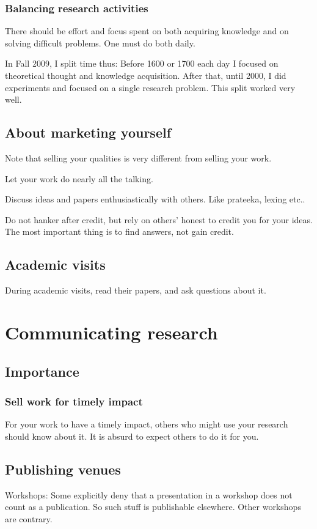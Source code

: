 \documentclass[oneside, article]{memoir}
\begin{document}
\subsection{Balancing research activities}
There should be effort and focus spent on both acquiring knowledge and on solving difficult problems. One must do both daily.

In Fall 2009, I split time thus: Before 1600 or 1700 each day I focused on theoretical thought and knowledge acquisition. After that, until 2000, I did experiments and focused on a single research problem. This split worked very well.

\section{About marketing yourself}
Note that selling your qualities is very different from selling your work.

Let your work do nearly all the talking.

Discuss ideas and papers enthusiastically with others. Like prateeka, lexing etc..

Do not hanker after credit, but rely on others' honest to credit you for your ideas. The most important thing is to find answers, not gain credit.

\section{Academic visits}
During academic visits, read their papers, and ask questions about it.

\chapter{Communicating research}
\section{Importance}
\subsection{Sell work for timely impact}
For your work to have a timely impact, others who might use your research should know about it. It is absurd to expect others to do it for you.

\section{Publishing venues}
Workshops: Some explicitly deny that a presentation in a workshop does not count as a publication. So such stuff is publishable elsewhere. Other workshops are contrary.
\end{document}
